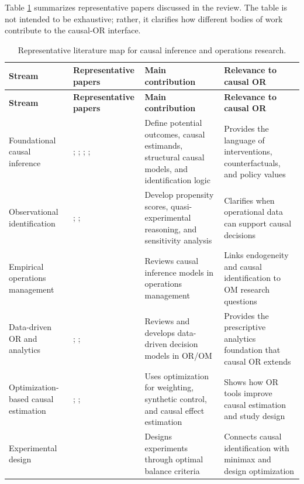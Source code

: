 \documentclass[11pt]{article}
\begin{document}
Table \ref{tab:lit-map} summarizes representative papers discussed in the review. The table is not intended to be exhaustive; rather, it clarifies how different bodies of work contribute to the causal-OR interface.

\begin{longtable}{p{} p{} p{} p{}}
\caption{Representative literature map for causal inference and operations research.}
\label{tab:lit-map}\\
\toprule
\textbf{Stream} & \textbf{Representative papers} & \textbf{Main contribution} & \textbf{Relevance to causal OR} \\
\midrule
\endfirsthead
\toprule
\textbf{Stream} & \textbf{Representative papers} & \textbf{Main contribution} & \textbf{Relevance to causal OR} \\
\midrule
\endhead
Foundational causal inference & \citet{rubin1974estimating}; \citet{holland1986statistics}; \citet{pearl2009causality}; \citet{imbens2015causal}; \citet{hernan2020causal} & Define potential outcomes, causal estimands, structural causal models, and identification logic & Provides the language of interventions, counterfactuals, and policy values \\
\midrule
Observational identification & \citet{rosenbaum1983central}; \citet{angrist2009mostly}; \citet{rosenbaum2002observational} & Develop propensity scores, quasi-experimental reasoning, and sensitivity analysis & Clarifies when operational data can support causal decisions \\
\midrule
Empirical operations management & \citet{ho2017causal} & Reviews causal inference models in operations management & Links endogeneity and causal identification to OM research questions \\
\midrule
Data-driven OR and analytics & \citet{misic2020data}; \citet{choi2018bigdata}; \citet{bertsimas2020predictive} & Reviews and develops data-driven decision models in OR/OM & Provides the prescriptive analytics foundation that causal OR extends \\
\midrule
Optimization-based causal estimation & \citet{hainmueller2012entropy}; \citet{abadie2010synthetic}; \citet{cousineau2023optimization} & Uses optimization for weighting, synthetic control, and causal effect estimation & Shows how OR tools improve causal estimation and study design \\
\midrule
Experimental design & \citet{kallus2018balance} & Designs experiments through optimal balance criteria & Connects causal identification with minimax and design optimization \\

\end{longtable}
\end{document}
